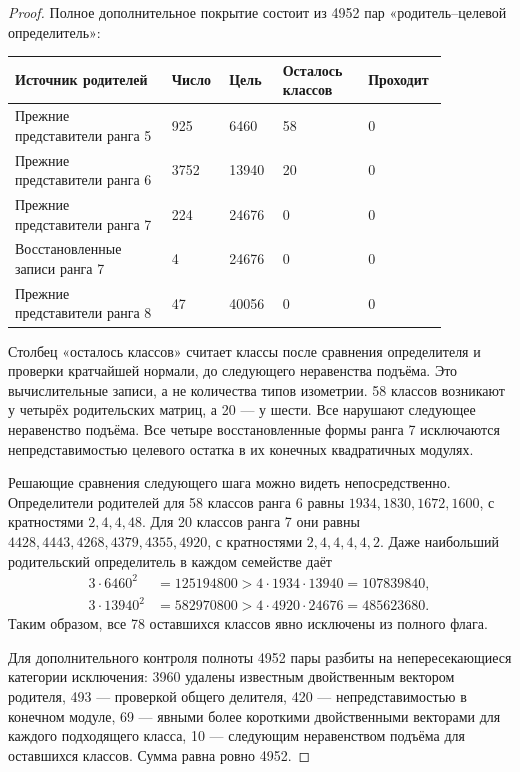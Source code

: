 \documentclass[11pt,a4paper]{article}
\theoremstyle{remark}\newtheorem{remark}[theorem]{Замечание}
\begin{document}
\begin{proof}
Полное дополнительное покрытие состоит из 4952 пар «родитель--целевой определитель»:
\begin{center}
\begin{tabular}{P{0.33\linewidth}P{0.10\linewidth}P{0.11\linewidth}P{0.18\linewidth}P{0.14\linewidth}}
\toprule
Источник родителей & Число & Цель & Осталось классов & Проходит\\\midrule
Прежние представители ранга 5 &925&6460&58&0\\
Прежние представители ранга 6 &3752&13940&20&0\\
Прежние представители ранга 7 &224&24676&0&0\\
Восстановленные записи ранга 7 &4&24676&0&0\\
Прежние представители ранга 8 &47&40056&0&0\\
\bottomrule
\end{tabular}
\end{center}
Столбец «осталось классов» считает классы после сравнения определителя и проверки кратчайшей нормали, до следующего неравенства подъёма. Это вычислительные записи, а не количества типов изометрии. 58 классов возникают у четырёх родительских матриц, а 20 --- у шести. Все нарушают следующее неравенство подъёма. Все четыре восстановленные формы ранга 7 исключаются непредставимостью целевого остатка в их конечных квадратичных модулях.

Решающие сравнения следующего шага можно видеть непосредственно. Определители родителей для 58 классов ранга 6 равны $1934,1830,1672,1600$, с кратностями $2,4,4,48$. Для 20 классов ранга 7 они равны $4428,4443,4268,4379,4355,4920$, с кратностями $2,4,4,4,4,2$. Даже наибольший родительский определитель в каждом семействе даёт
\[
\begin{aligned}
3\cdot6460^2&=125194800>4\cdot1934\cdot13940=107839840,\\
3\cdot13940^2&=582970800>4\cdot4920\cdot24676=485623680.
\end{aligned}
\]
Таким образом, все 78 оставшихся классов явно исключены из полного флага.

Для дополнительного контроля полноты 4952 пары разбиты на непересекающиеся категории исключения: 3960 удалены известным двойственным вектором родителя, 493 --- проверкой общего делителя, 420 --- непредставимостью в конечном модуле, 69 --- явными более короткими двойственными векторами для каждого подходящего класса, 10 --- следующим неравенством подъёма для оставшихся классов. Сумма равна ровно 4952.


\end{proof}
\end{document}
